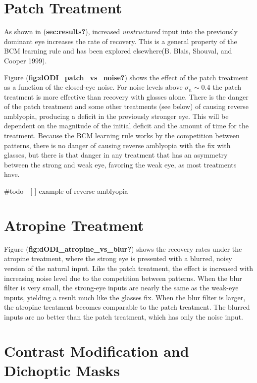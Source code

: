 \documentclass[
  letterpaper,
  DIV=11,
  numbers=noendperiod]{scrreprt}
\begin{document}
\hypertarget{patch-treatment-1}{%
\section{Patch Treatment}\label{patch-treatment-1}}

As shown in (\textbf{sec:results?}), increased \emph{unstructured} input
into the previously dominant eye increases the rate of recovery. This is
a general property of the BCM learning rule and has been explored
elsewhere(B. Blais, Shouval, and Cooper 1999).

Figure (\textbf{fig:dODI\_patch\_vs\_noise?}) shows the effect of the
patch treatment as a function of the closed-eye noise. For noise levels
above \(\sigma_n \sim 0.4\) the patch treatment is more effective than
recovery with glasses alone. There is the danger of the patch treatment
and some other treatments (see below) of causing reverse amblyopia,
producing a deficit in the previously stronger eye. This will be
dependent on the magnitude of the initial deficit and the amount of time
for the treatment. Because the BCM learning rule works by the
competition between patterns, there is no danger of causing reverse
amblyopia with the fix with glasses, but there is that danger in any
treatment that has an asymmetry between the strong and weak eye,
favoring the weak eye, as most treatments have.

\#todo - {[} {]} example of reverse amblyopia

\hypertarget{atropine-treatment-1}{%
\section{Atropine Treatment}\label{atropine-treatment-1}}

Figure (\textbf{fig:dODI\_atropine\_vs\_blur?}) shows the recovery rates
under the atropine treatment, where the strong eye is presented with a
blurred, noisy version of the natural input. Like the patch treatment,
the effect is increased with increasing noise level due to the
competition between patterns. When the blur filter is very small, the
strong-eye inputs are nearly the same as the weak-eye inputs, yielding a
result much like the glasses fix. When the blur filter is larger, the
atropine treatment becomes comparable to the patch treatment. The
blurred inputs are no better than the patch treatment, which has only
the noise input.

\hypertarget{contrast-modification-and-dichoptic-masks}{%
\section{Contrast Modification and Dichoptic
Masks}\label{contrast-modification-and-dichoptic-masks}}
\end{document}
